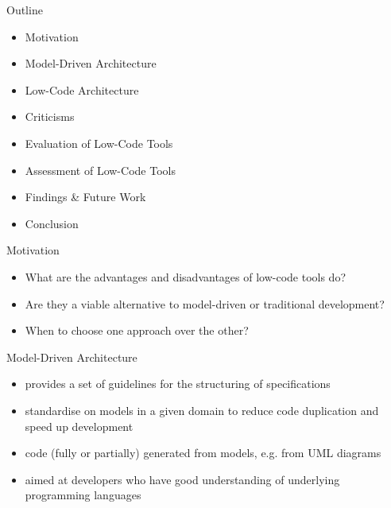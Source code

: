 \documentclass[aspectratio=169]{beamer}
\date{\formatdate{12}{01}{2021}}
\institute{supervised by Prof. Dr. Ruth Breu}
\begin{document}
  \maketitle

  \begin{frame}{Outline}
    \begin{itemize}
      \item Motivation
      \item Model-Driven Architecture
      \item Low-Code Architecture
      \item Criticisms
      \item Evaluation of Low-Code Tools
      \item Assessment of Low-Code Tools
      \item Findings \& Future Work
      \item Conclusion
    \end{itemize}
  \end{frame}

  \begin{frame}{Motivation}
    \begin{itemize}
      \item What are the advantages and disadvantages of low-code tools do?
      \item Are they a viable alternative to model-driven or traditional development?
      \item When to choose one approach over the other?
    \end{itemize}
  \end{frame}

  \begin{frame}{Model-Driven Architecture}
    \begin{itemize}
      \item provides a set of guidelines for the structuring of specifications
      \item standardise on models in a given domain to reduce code duplication and speed up development
      \item code (fully or partially) generated from models, e.g. from UML diagrams
      \item aimed at developers who have good understanding of underlying programming languages
    \end{itemize}
  \end{frame}
\end{document}

